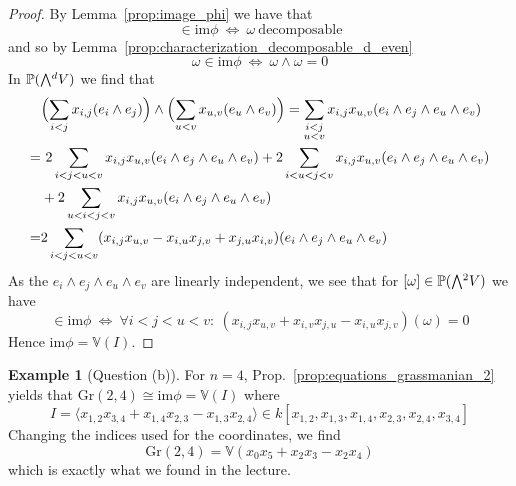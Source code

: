 \documentclass{scrartcl}
\newcommand{\V}{\mathbb{V}}
\newcommand{\Proj}{\mathbb{P}}
\newcommand{\Gr}{\mathrm{Gr}}
\newcommand{\extpow}{\mathchoice{{\textstyle\bigwedge}}
    {{\bigwedge}}
    {{\textstyle\wedge}}
    {{\scriptstyle\wedge}}}
\theoremstyle{definition}
\newtheorem{example}[subsection]{Example}
\begin{document}
\begin{proof}
    By Lemma~\ref{prop:image_phi} we have that
    \begin{equation*}
        [\omega] \in \mathrm{im}\phi \ \Leftrightarrow \ \omega\ \text{decomposable}
    \end{equation*}
    and so by Lemma~\ref{prop:characterization_decomposable_d_even}
    \begin{equation*}
        \omega \in \mathrm{im}\phi \ \Leftrightarrow \ \omega \wedge \omega = 0
    \end{equation*}
    In $\Proj(\extpow^d V)$ we find that
    \begin{align*}
        &\Bigl( \sum_{i < j} x_{i, j} (e_i \wedge e_j) \Bigr) \wedge \Bigl( \sum_{u < v} x_{u, v} (e_u \wedge e_v) \Bigr) = \sum_{\substack{i < j\\u < v}} x_{i, j} x_{u, v} (e_i \wedge e_j \wedge e_u \wedge e_v) \\
        =& \ 2\sum_{\substack{i < j < u < v}} x_{i, j} x_{u, v} (e_i \wedge e_j \wedge e_u \wedge e_v) + 2\sum_{\substack{i < u < j < v}} x_{i, j} x_{u, v} (e_i \wedge e_j \wedge e_u \wedge e_v) \\
        &+ 2\sum_{\substack{u < i < j < v}} x_{i, j} x_{u, v} (e_i \wedge e_j \wedge e_u \wedge e_v) \\
        =&2 \sum_{i < j < u < v} (x_{i, j} x_{u, v} - x_{i, u} x_{j, v} + x_{j, u} x_{i, v}) (e_i \wedge e_j \wedge e_u \wedge e_v)
    \end{align*}
    As the $e_i \wedge e_j \wedge e_u \wedge e_v$ are linearly independent, we see that for $[\omega] \in \Proj(\extpow^2 V)$ we have
    \begin{equation*}
        [\omega] \in \mathrm{im}\phi \ \Leftrightarrow \ \forall i < j < u < v: \ (x_{i, j} x_{u, v} + x_{i, v} x_{j, u} - x_{i, u} x_{j, v})(\omega) = 0
    \end{equation*}
    Hence $\mathrm{im}\phi = \V(I)$.
\end{proof}
\begin{example}[Question (b)]
    For $n = 4$, Prop.~\ref{prop:equations_grassmanian_2} yields that $\Gr(2, 4) \cong \mathrm{im}\phi = \V(I)$ where
    \begin{equation*}
        I = \langle x_{1, 2} x_{3, 4} + x_{1, 4} x_{2, 3} - x_{1, 3} x_{2, 4} \rangle \in k[x_{1, 2}, x_{1, 3}, x_{1, 4}, x_{2, 3}, x_{2, 4}, x_{3, 4}]
    \end{equation*}
    Changing the indices used for the coordinates, we find
    \begin{equation*}
        \Gr(2, 4) = \V(x_0 x_5 + x_2 x_3 - x_2 x_4)
    \end{equation*}
    which is exactly what we found in the lecture.
\end{example}
\end{document}
